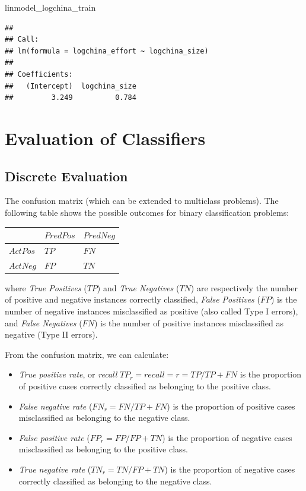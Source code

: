 \documentclass[]{book}
\newenvironment{Shaded}{\begin{snugshade}}{\end{snugshade}}
\newcommand{\NormalTok}[1]{{#1}}
\providecommand{\tightlist}{%
  \setlength{\itemsep}{0pt}\setlength{\parskip}{0pt}}
\begin{document}
\begin{Shaded}
\begin{Highlighting}[]
\NormalTok{linmodel_logchina_train}
\end{Highlighting}
\end{Shaded}

\begin{verbatim}
## 
## Call:
## lm(formula = logchina_effort ~ logchina_size)
## 
## Coefficients:
##   (Intercept)  logchina_size  
##         3.249          0.784
\end{verbatim}

\section{Evaluation of Classifiers}\label{evaluation-of-classifiers}

\subsection{Discrete Evaluation}\label{discrete-evaluation}

The confusion matrix (which can be extended to multiclass problems). The
following table shows the possible outcomes for binary classification
problems:

\begin{longtable}[]{@{}lll@{}}
\toprule
& \(Pred Pos\) & \(Pred Neg\)\tabularnewline
\midrule
\endhead
\(Act Pos\) & \(TP\) & \(FN\)\tabularnewline
\(Act Neg\) & \(FP\) & \(TN\)\tabularnewline
\bottomrule
\end{longtable}

where \emph{True Positives} (\(TP\)) and \emph{True Negatives} (\(TN\))
are respectively the number of positive and negative instances correctly
classified, \emph{False Positives} (\(FP\)) is the number of negative
instances misclassified as positive (also called Type I errors), and
\emph{False Negatives} (\(FN\)) is the number of positive instances
misclassified as negative (Type II errors).

From the confusion matrix, we can calculate:

\begin{itemize}
\tightlist
\item
  \emph{True positive rate}, or \emph{recall }
  \(TP_r = recall = r = TP/TP+FN\) is the proportion of positive cases
  correctly classified as belonging to the positive class.
\item
  \emph{False negative rate} (\(FN_r=FN/TP+FN\)) is the proportion of
  positive cases misclassified as belonging to the negative class.
\item
  \emph{False positive rate} (\(FP_r=FP/FP+TN\)) is the proportion of
  negative cases misclassified as belonging to the positive class.
\item
  \emph{True negative rate} (\(TN_r=TN/FP+TN\)) is the proportion of
  negative cases correctly classified as belonging to the negative
  class.
\end{itemize}
\end{document}
